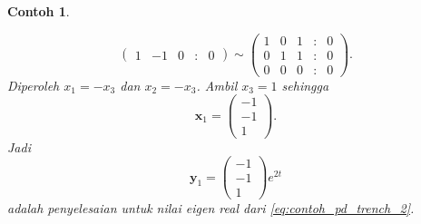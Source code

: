 \documentclass[a4paper]{article}
\theoremstyle{definisi}
\newtheorem{contoh}{Contoh}[section]
\numberwithin{equation}{section}
\begin{document}
\begin{contoh}
\begin{enumerate}[label=Langkah \arabic*: ,leftmargin=*]
\begin{equation*}
\begin{pmatrix}
          1 & -1 & 0 &:& 0
        \end{pmatrix} \sim \begin{pmatrix}
          1 & 0 & 1 &:& 0\\
          0 & 1 & 1 &:& 0\\
          0 & 0 & 0 &:& 0
        \end{pmatrix}.
      \end{equation*}
      Diperoleh $x_1 = -x_3$ dan $x_2 = -x_3$. Ambil $x_3 = 1$ sehingga
      \[\mathbf{x}_1 = \begin{pmatrix}-1\\-1\\1\end{pmatrix}.\]
      Jadi
      \[\mathbf{y}_1 = \begin{pmatrix}-1\\-1\\1\end{pmatrix}e^{2t}\]
      adalah penyelesaian untuk nilai eigen real dari \eqref{eq:contoh_pd_trench_2}. 


\end{enumerate}
\end{contoh}
\end{document}
